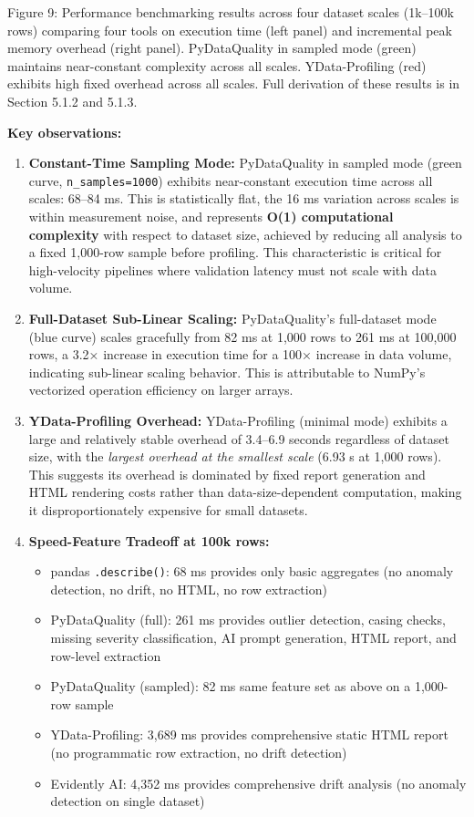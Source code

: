 \documentclass{article}
\begin{document}
Figure 9: Performance benchmarking results across four dataset scales
(1k--100k rows) comparing four tools on execution time (left panel) and
incremental peak memory overhead (right panel). PyDataQuality in sampled
mode (green) maintains near-constant complexity across all scales.
YData-Profiling (red) exhibits high fixed overhead across all scales.
Full derivation of these results is in Section 5.1.2 and 5.1.3.

\textbf{Key observations:}

\begin{enumerate}
\def\labelenumi{\arabic{enumi}.}
\item
  \textbf{Constant-Time Sampling Mode:} PyDataQuality in sampled mode
  (green curve, \texttt{n\_samples=1000}) exhibits near-constant
  execution time across all scales: 68--84 ms. This is statistically
  flat, the 16 ms variation across scales is within measurement noise,
  and represents \textbf{O(1) computational complexity} with respect to
  dataset size, achieved by reducing all analysis to a fixed 1,000-row
  sample before profiling. This characteristic is critical for
  high-velocity pipelines where validation latency must not scale with
  data volume.
\item
  \textbf{Full-Dataset Sub-Linear Scaling:} PyDataQuality's full-dataset
  mode (blue curve) scales gracefully from 82 ms at 1,000 rows to 261 ms
  at 100,000 rows, a 3.2× increase in execution time for a 100× increase
  in data volume, indicating sub-linear scaling behavior. This is
  attributable to NumPy's vectorized operation efficiency on larger
  arrays.
\item
  \textbf{YData-Profiling Overhead:} YData-Profiling (minimal mode)
  exhibits a large and relatively stable overhead of 3.4--6.9 seconds
  regardless of dataset size, with the \emph{largest overhead at the
  smallest scale} (6.93 s at 1,000 rows). This suggests its overhead is
  dominated by fixed report generation and HTML rendering costs rather
  than data-size-dependent computation, making it disproportionately
  expensive for small datasets.
\item
  \textbf{Speed-Feature Tradeoff at 100k rows:}

  \begin{itemize}
  \item
    pandas \texttt{.describe()}: 68 ms provides only basic aggregates
    (no anomaly detection, no drift, no HTML, no row extraction)
  \item
    PyDataQuality (full): 261 ms provides outlier detection, casing
    checks, missing severity classification, AI prompt generation, HTML
    report, and row-level extraction
  \item
    PyDataQuality (sampled): 82 ms same feature set as above on a
    1,000-row sample
  \item
    YData-Profiling: 3,689 ms provides comprehensive static HTML report
    (no programmatic row extraction, no drift detection)
  \item
    Evidently AI: 4,352 ms provides comprehensive drift analysis (no
    anomaly detection on single dataset)
  \end{itemize}
\end{enumerate}
\end{document}
